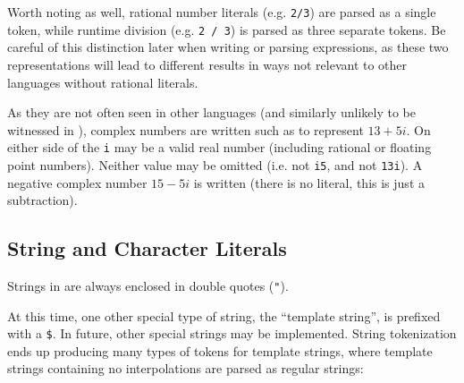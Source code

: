 Worth noting as well, rational number literals (e.g. \texttt{2/3}) are
parsed as a single token, while runtime division (e.g. \texttt{2 / 3})
is parsed as three separate tokens. Be careful of this distinction later
when writing or parsing expressions, as these two representations will
lead to different results in ways not relevant to other languages without
rational literals.

As they are not often seen in other languages (and similarly unlikely to
be witnessed in \Trilogy{}), complex numbers are written such as 
to represent $13 + 5i$. On either side of the \texttt{i} may be a valid
real number (including rational or floating point numbers). Neither value
may be omitted (i.e.  not \texttt{i5}, and  not
\texttt{13i}). A negative complex number $15 - 5i$ is written 
(there is no literal, this is just a subtraction).

\subsection{String and Character Literals}

Strings in \Trilogy{} are always enclosed in double quotes (\texttt{"}).

At this time, one other special type of string, the ``template string'',
is prefixed with a \texttt{\$}. In future, other special strings may be %
implemented. String tokenization ends up producing many types of tokens
for template strings, where template strings containing no interpolations
are parsed as regular strings:

\begin{bnf*}
     \\
    \\
     \\
     \\
     \\
     \\
\end{bnf*}

